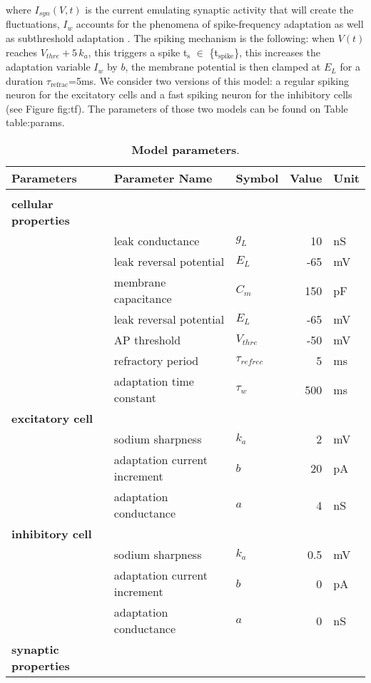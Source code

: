\documentclass[8pt, colorlinks, a4paper]{article}
\renewcommand\ref{}
\begin{document}
where $I_{syn}(V, t)$ is the current emulating synaptic activity that
will create the fluctuations, $I_w$ accounts for the phenomena of
spike-frequency adaptation as well as subthreshold adaptation
\cite{McCormick1985}. The spiking mechanism is the following: when
$V(t)$ reaches \(V_{thre}+5 \, k_a \), this triggers a spike
t$_{\text{s}}$ $\in$ \{t$_{\text{spike}}$\}, this increases the
adaptation variable $I_w$ by \(b\), the membrane potential is then
clamped at \(E_L\) for a duration
$\tau$$_{\text{refrac}}$=5ms. We consider two versions of this model:
a regular spiking neuron for the excitatory cells and a fast spiking
neuron for the inhibitory cells (see Figure \ref{fig:tf}). The
parameters of those two models can be found on Table
\ref{table:params}.

\begin{table*}[tb!]
\caption{\label{table:params}\textbf{Model parameters}.}
\centering
\begin{tabular}{l|l|l|r|l}
\textbf{Parameters} & Parameter Name & Symbol & Value & Unit\\
\hline
 &  &  &  & \\
\textbf{cellular properties} &  &  &  & \\
 & leak conductance & \(g_L\) & 10 & nS\\
 & leak reversal potential & \(E_L\) & -65 & mV\\
 & membrane capacitance & \(C_m\) & 150 & pF\\
 & leak reversal potential & \(E_L\) & -65 & mV\\
 & AP threshold & \(V_{thre}\) & -50 & mV\\
 & refractory period & \(\tau_{refrec}\) & 5 & ms\\
 & adaptation time constant & \(\tau_w\) & 500 & ms\\
\textbf{excitatory cell} &  &  &  & \\
 & sodium sharpness & \(k_a\) & 2 & mV\\
 & adaptation current increment & \(b\) & 20 & pA\\
 & adaptation conductance & \(a\) & 4 & nS\\
\textbf{inhibitory cell} &  &  &  & \\
 & sodium sharpness & \(k_a\) & 0.5 & mV\\
 & adaptation current increment & \(b\) & 0 & pA\\
 & adaptation conductance & \(a\) & 0 & nS\\
\textbf{synaptic properties} &  &  &  & \\

\end{tabular}
\end{table*}
\end{document}
